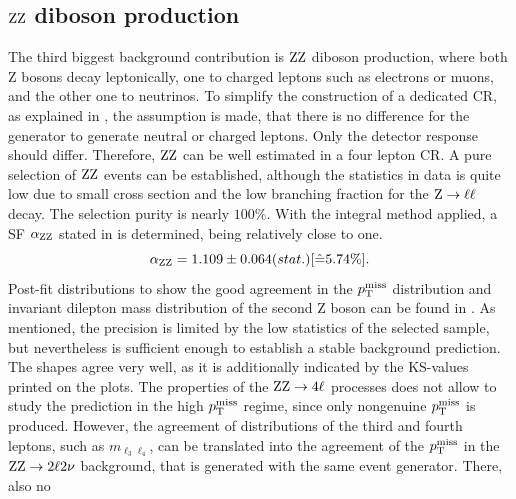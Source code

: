 \subsection{$\mathrm{Z}\mathrm{Z}$ diboson production}
The third biggest background contribution is $\mathrm{Z}\mathrm{Z}$ diboson production, where both Z bosons decay leptonically, one to charged leptons such as electrons or muons, and the other one to neutrinos. To simplify the construction of a dedicated CR, as explained in , the assumption is made, that there is no difference for the generator to generate neutral or charged leptons. Only the detector response should differ. Therefore, $\mathrm{Z}\mathrm{Z}$ can be well estimated in a four lepton CR. A pure selection of $\mathrm{Z}\mathrm{Z}$ events can be established, although the statistics in data is quite low due to small cross section and the low branching fraction for the $\mathrm{Z}\to\ell\ell$ decay. The selection purity is nearly $100\%$.
%
With the integral method applied, a SF $\alpha_{\mathrm{Z}\mathrm{Z}}$ stated in  is determined, being relatively close to one.
\begin{equation}\label{eq:AlphaZZ}
 \alpha_{\mathrm{Z}\mathrm{Z}}=1.109 \pm 0.064 (stat.) [\hat{=}5.74\%].
\end{equation}
Post-fit distributions to show the good agreement in the $p_{\mathrm{T}}^\text{miss}$ distribution and invariant dilepton mass distribution of the second Z boson can be found in . As mentioned, the precision is limited by the low statistics of the selected sample, but nevertheless is sufficient enough to establish a stable background prediction. The shapes agree very well, as it is additionally indicated by the KS-values printed on the plots. The properties of the $\mathrm{Z}\mathrm{Z}\to4\ell$ processes does not allow to study the prediction in the high $p_{\mathrm{T}}^\text{miss}$ regime, since only nongenuine $p_{\mathrm{T}}^\text{miss}$ is produced. However, the agreement of distributions of the third and fourth leptons, such as $m_{\ell_3\ell_4}$, can be translated into the agreement of the $p_{\mathrm{T}}^\text{miss}$ in the $\mathrm{Z}\mathrm{Z}\to2\ell2\nu$ background, that is generated with the same event generator. There, also no
